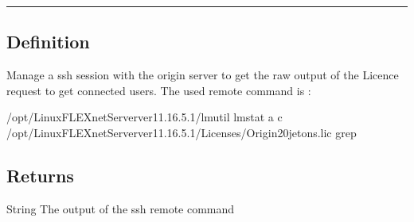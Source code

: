 \documentclass[letterpaper,10pt,english]{sphinxmanual}
\begin{document}
\bigskip\hrule\bigskip



\subsection{Definition}
\label{\detokenize{OA/Get_origin_connected:definition}}
\sphinxAtStartPar
Manage a ssh session with the origin server to get the raw output of the Licence request to get connected users.
The used remote command is :

\begin{sphinxVerbatim}[commandchars=\\\{\}]
/opt/Linux\PYGZus{}FLEXnet\PYGZus{}Server\PYGZus{}ver\PYGZus{}11.16.5.1/lmutil  lmstat \PYGZhy{}a \PYGZhy{}c /opt/Linux\PYGZus{}FLEXnet\PYGZus{}Server\PYGZus{}ver\PYGZus{}11.16.5.1/Licenses/Origin\PYGZus{}20jetons.lic  grep 
\end{sphinxVerbatim}


\subsection{Returns}
\label{\detokenize{OA/Get_origin_connected:returns}}
\sphinxAtStartPar
String
The output of the ssh remote command
\end{document}
